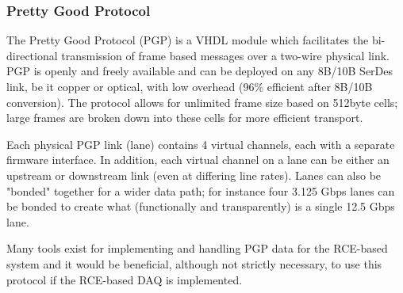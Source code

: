 



\subsubsection{Pretty Good Protocol}
\label{sec:PGP}
The Pretty Good Protocol (PGP)\cite{bib:pgp} is a VHDL module which facilitates the bi-directional transmission of frame based messages over a two-wire physical link.  PGP is openly and freely available and can be deployed on any 8B/10B SerDes link, be it copper or optical, with low overhead (96\% efficient after 8B/10B conversion).   The protocol allows for unlimited frame size based on 512byte cells; large frames are broken down into these cells for more efficient transport.  

Each physical PGP link (lane) contains 4 virtual channels, each with a separate firmware interface.  In addition, each virtual channel on a lane can be either an upstream or downstream link (even at differing line rates).  Lanes can also be "bonded" together for a wider data path; for instance four 3.125 Gbps lanes can be bonded to create what (functionally and transparently) is a single 12.5 Gbps lane.   

Many tools exist for implementing and handling PGP data for the RCE-based system and it  would be beneficial, although not strictly necessary, to use this protocol if the RCE-based DAQ is implemented.  
